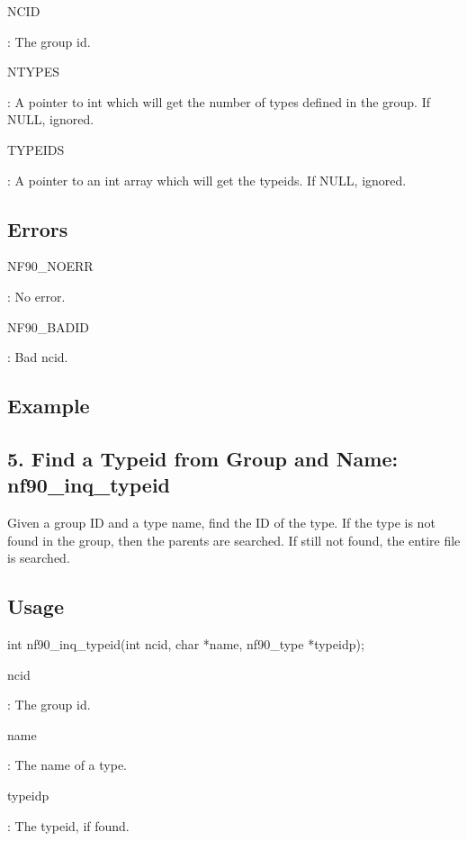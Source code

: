 {\ttfamily N\+C\+ID}

\+: The group id.

{\ttfamily N\+T\+Y\+P\+ES}

\+: A pointer to int which will get the number of types defined in the group. If N\+U\+LL, ignored.

{\ttfamily T\+Y\+P\+E\+I\+DS}

\+: A pointer to an int array which will get the typeids. If N\+U\+LL, ignored.

\subsection*{Errors}

{\ttfamily N\+F90\+\_\+\+N\+O\+E\+RR}

\+: No error.

{\ttfamily N\+F90\+\_\+\+B\+A\+D\+ID}

\+: Bad ncid.

\subsection*{Example}\hypertarget{f90-user-defined-data-types_f90-find-a-typeid-from-group-and-name-nf90_inq_typeid}{}\subsection{5. Find a Typeid from Group and Name\+: nf90\+\_\+inq\+\_\+typeid }\label{f90-user-defined-data-types_f90-find-a-typeid-from-group-and-name-nf90_inq_typeid}
Given a group ID and a type name, find the ID of the type. If the type is not found in the group, then the parents are searched. If still not found, the entire file is searched.

\subsection*{Usage}


\begin{DoxyCode}
int nf90\_inq\_typeid(int ncid, char *name, nf90\_type *typeidp);
\end{DoxyCode}


{\ttfamily ncid}

\+: The group id.

{\ttfamily name}

\+: The name of a type.

{\ttfamily typeidp}

\+: The typeid, if found.

